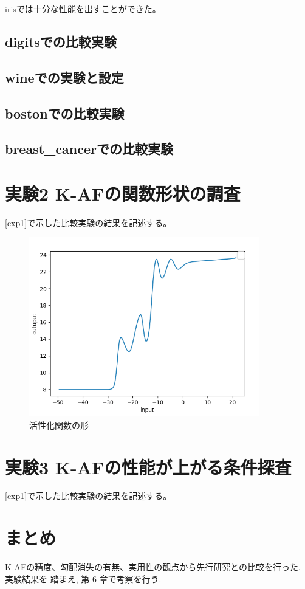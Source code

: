irisでは十分な性能を出すことができた。


\subsection{digitsでの比較実験}
\label{ev:digitsでの比較実験}

\subsection{wineでの実験と設定}
\label{ev:wineでの実験と設定}

\subsection{bostonでの比較実験}
\label{ev:bostonでの比較実験}

\subsection{breast\_cancerでの比較実験}
\label{ev:breastcancer}

\section{実験2 K-AFの関数形状の調査}
\ref{exp1}で示した比較実験の結果を記述する。


\begin{figure}[hbtp]
    \begin{center}
        \includegraphics[width=10cm]{asset/boston_0000001_SGDkaiming_normal__non_200_function_2.png}
            \caption{活性化関数の形}
            \label{boston}
    \end{center}
\end{figure}


\section{実験3 K-AFの性能が上がる条件探査}
\ref{exp1}で示した比較実験の結果を記述する。

\section{まとめ}

K-AFの精度、勾配消失の有無、実用性の観点から先行研究との比較を行った. 実験結果を
踏まえ, 第 6 章で考察を行う.


